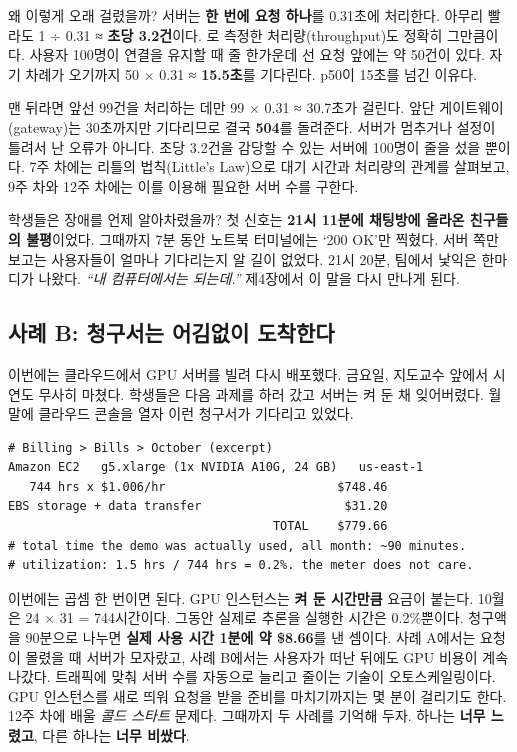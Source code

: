 왜 이렇게 오래 걸렸을까? 서버는 \textbf{한 번에 요청 하나}를 0.31초에 처리한다. 아무리 빨라도 1 ÷ 0.31 ≈ \textbf{초당 3.2건}이다. 로 측정한 처리량(throughput)도 정확히 그만큼이다. 사용자 100명이 연결을 유지할 때 줄 한가운데 선 요청 앞에는 약 50건이 있다. 자기 차례가 오기까지 50 × 0.31 ≈ \textbf{15.5초}를 기다린다. p50이 15초를 넘긴 이유다.

맨 뒤라면 앞선 99건을 처리하는 데만 99 × 0.31 ≈ 30.7초가 걸린다. 앞단 게이트웨이(gateway)는 30초까지만 기다리므로 결국 \textbf{504}를 돌려준다. 서버가 멈추거나 설정이 틀려서 난 오류가 아니다. 초당 3.2건을 감당할 수 있는 서버에 100명이 줄을 섰을 뿐이다. 7주 차에는 리틀의 법칙(Little's Law)으로 대기 시간과 처리량의 관계를 살펴보고, 9주 차와 12주 차에는 이를 이용해 필요한 서버 수를 구한다.

학생들은 장애를 언제 알아차렸을까? 첫 신호는 \textbf{21시 11분에 채팅방에 올라온 친구들의 불평}이었다. 그때까지 7분 동안 노트북 터미널에는 ‘200 OK’만 찍혔다. 서버 쪽만 보고는 사용자들이 얼마나 기다리는지 알 길이 없었다. 21시 20분, 팀에서 낯익은 한마디가 나왔다. \textit{“내 컴퓨터에서는 되는데.”} 제4장에서 이 말을 다시 만나게 된다.

\subsection*{사례 B: 청구서는 어김없이 도착한다}

이번에는 클라우드에서 GPU 서버를 빌려 다시 배포했다. 금요일, 지도교수 앞에서 시연도 무사히 마쳤다. 학생들은 다음 과제를 하러 갔고 서버는 켜 둔 채 잊어버렸다. 월말에 클라우드 콘솔을 열자 이런 청구서가 기다리고 있었다.

\begin{terminalbox}
\begin{Verbatim}[breaklines=true,breakanywhere=true,fontsize=\small,formatcom=\color{tbbtermfg},codes=\tbbcodeactive]
# Billing > Bills > October (excerpt)
Amazon EC2   g5.xlarge (1x NVIDIA A10G, 24 GB)   us-east-1
   744 hrs x $1.006/hr                        $748.46
EBS storage + data transfer                    $31.20
                                     TOTAL    $779.66
# total time the demo was actually used, all month: ~90 minutes.
# utilization: 1.5 hrs / 744 hrs = 0.2%. the meter does not care.
\end{Verbatim}
\end{terminalbox}

이번에는 곱셈 한 번이면 된다. GPU 인스턴스는 \textbf{켜 둔 시간만큼} 요금이 붙는다. 10월은 24 × 31 = 744시간이다. 그동안 실제로 추론을 실행한 시간은 0.2\%뿐이다. 청구액을 90분으로 나누면 \textbf{실제 사용 시간 1분에 약 \$8.66}를 낸 셈이다. 사례 A에서는 요청이 몰렸을 때 서버가 모자랐고, 사례 B에서는 사용자가 떠난 뒤에도 GPU 비용이 계속 나갔다. 트래픽에 맞춰 서버 수를 자동으로 늘리고 줄이는 기술이 오토스케일링이다. GPU 인스턴스를 새로 띄워 요청을 받을 준비를 마치기까지는 몇 분이 걸리기도 한다. 12주 차에 배울 \textit{콜드 스타트} 문제다. 그때까지 두 사례를 기억해 두자. 하나는 \textbf{너무 느렸고}, 다른 하나는 \textbf{너무 비쌌다}.

